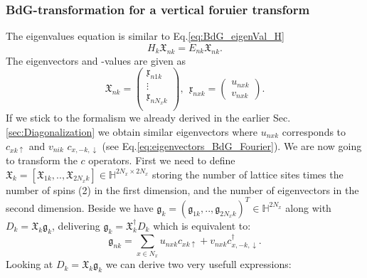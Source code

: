 \documentclass[../main.tex]{subfile}
\begin{document}
\subsubsection{BdG-transformation for a vertical foruier transform}
The eigenvalues equation is similar to Eq.\ref{eq:BdG_eigenVal_H}
\begin{equation}\label{eq:BdG_eigenVal_H_k}
    H_k \mathfrak{X}_{nk} = E_{nk} \mathfrak{X}_{nk}.
\end{equation}
The eigenvectors and -values are given as
\begin{equation*}
    \mathfrak{X}_{nk} = \begin{pmatrix}
        \mathfrak{x}_{n1k}\\
        \vdots\\
        \mathfrak{x}_{nN_xk}\\
    \end{pmatrix},~~ \mathfrak{x}_{nxk} = \begin{pmatrix}
        u_{nxk}\\
        v_{nxk}
    \end{pmatrix}.
\end{equation*}
If we stick to the formalism we already derived in the earlier Sec.\ref{sec:Diagonalization} we obtain similar 
eigenvectors where $u_{nxk}$ corresponds to $c_{xk\uparrow}$ and $v_{nik}$  $c_{x,-k,\downarrow}$ (see Eq.\ref{eq:eigenvectors_BdG_Fourier}). We are now going to transform the $c$ operators. First we need
to define $\mathfrak{X}_k = [\mathfrak{X}_{1k}, ..,\mathfrak{X}_{2N_xk}]\in\mathbb{H}^{2N_x\times 2N_x}$ storing the number of 
lattice sites times the number of spins (2) in the first dimension, and 
the number of eigenvectors in the second dimension. Beside we have $\mathfrak{g}_k = (\mathfrak{g}_{1k}, .., \mathfrak{g}_{2N_xk})^T\in\mathbb{H}^{2N_x}$ along with $D_{k} = \mathfrak{X}_k\mathfrak{g}_k$,
delivering $\mathfrak{g}_k = \mathfrak{X}^{\dagger}_k D_{k}$ which is equivalent to:
\begin{equation}\label{eq:eigenvectors_BdG_Fourier}
    \mathfrak{g}_{nk} = \sum_{x\in{N_x}} u_{nxk}c_{xk\uparrow} + v_{nxk}c^{\dagger}_{x,-k,\downarrow}.
\end{equation}
Looking at $D_{k} = \mathfrak{X}_k\mathfrak{g}_k$ we can derive two very usefull expressions:
\end{document}

